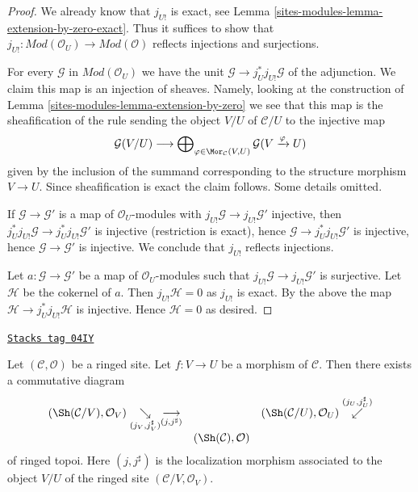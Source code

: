 \begin{proof}
We already know that $j_{U!}$ is exact, see
Lemma \ref{sites-modules-lemma-extension-by-zero-exact}.
Thus it suffices to show that
$j_{U!} :  \textit{Mod}(\mathcal{O}_U) \to \textit{Mod}(\mathcal{O})$
reflects injections and surjections.

\medskip\noindent
For every $\mathcal{G}$ in $\textit{Mod}(\mathcal{O}_U)$
we have the unit $\mathcal{G} \to j_U^*j_{U!}\mathcal{G}$
of the adjunction. We claim this map is an injection of sheaves.
Namely, looking at the construction of Lemma \ref{sites-modules-lemma-extension-by-zero}
we see that this map is the sheafification of the rule sending the object
$V/U$ of $\mathcal{C}/U$ to the injective map
$$
\mathcal{G}(V/U) \longrightarrow
\bigoplus\nolimits_{\varphi \in \Mor_\mathcal{C}(V, U)}
\mathcal{G}(V \xrightarrow{\varphi} U)
$$
given by the inclusion of the summand corresponding to the structure
morphism $V \to U$. Since sheafification is exact the claim follows.
Some details omitted.

\medskip\noindent
If $\mathcal{G} \to \mathcal{G}'$ is a map of $\mathcal{O}_U$-modules with
$j_{U!}\mathcal{G} \to j_{U!}\mathcal{G}'$ injective,
then $j_U^*j_{U!}\mathcal{G} \to j_U^*j_{U!}\mathcal{G}'$ is injective
(restriction is exact), hence
$\mathcal{G} \to j_U^*j_{U!}\mathcal{G}'$ is injective, hence
$\mathcal{G} \to \mathcal{G}'$ is injective.
We conclude that $j_{U!}$ reflects injections.

\medskip\noindent
Let $a : \mathcal{G} \to \mathcal{G}'$ be a map of $\mathcal{O}_U$-modules
such that $j_{U!}\mathcal{G} \to j_{U!}\mathcal{G}'$ is surjective.
Let $\mathcal{H}$ be the cokernel of $a$.
Then $j_{U!}\mathcal{H} = 0$ as $j_{U!}$ is exact.
By the above the map $\mathcal{H} \to j^*_U j_{U!}\mathcal{H}$
is injective. Hence $\mathcal{H} = 0$ as desired.
\end{proof}

\begin{lemma}[Relocalize]
\label{sites-modules-lemma-relocalize}
\href{https://stacks.math.columbia.edu/tag/04IY}{\texttt{Stacks tag 04IY}}

Let $(\mathcal{C}, \mathcal{O})$ be a ringed site.
Let $f : V \to U$ be a morphism of $\mathcal{C}$.
Then there exists a commutative diagram
$$
\begin{array}{ccc}(\Sh(\mathcal{C}/V), \mathcal{O}_V)
\underset{(j_V, j_V^\sharp)}{\searrow}\underset{(j, j^\sharp)}{\longrightarrow} &  & (\Sh(\mathcal{C}/U), \mathcal{O}_U)
\overset{(j_U, j_U^\sharp)}{\swarrow} \\  & (\Sh(\mathcal{C}), \mathcal{O}) & \end{array}
$$
of ringed topoi. Here $(j, j^\sharp)$ is the localization morphism
associated to the object $V/U$ of the ringed site
$(\mathcal{C}/V, \mathcal{O}_V)$.
\end{lemma}

